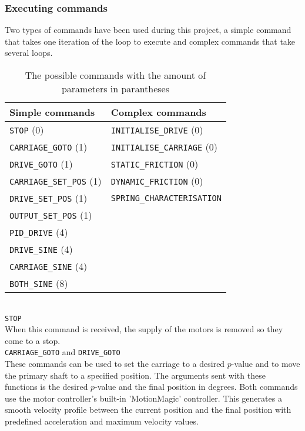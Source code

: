 \documentclass[12pt]{article}
\begin{document}
\subsubsection{Executing commands}
Two types of commands have been used during this project, a simple command that takes one iteration of the loop to execute and complex commands that take several loops. 
\begin{table}[]
    \centering
    \begin{tabular}{|l|l|}
         \hline
         \textbf{Simple commands}&\textbf{Complex commands}  \\
        \hline
         \verb|STOP| (0)&\verb|INITIALISE_DRIVE| (0)\\
         \verb|CARRIAGE_GOTO| (1)&\verb|INITIALISE_CARRIAGE| (0)\\
        \verb|DRIVE_GOTO| (1)&\verb|STATIC_FRICTION| (0)\\
        \verb|CARRIAGE_SET_POS| (1)&\verb|DYNAMIC_FRICTION| (0)\\
        \verb|DRIVE_SET_POS| (1)&\verb|SPRING_CHARACTERISATION|\\
        \verb|OUTPUT_SET_POS| (1)&\\
        \verb|PID_DRIVE| (4)&\\
        \verb|DRIVE_SINE| (4)&\\
        \verb|CARRIAGE_SINE| (4)&\\
        \verb|BOTH_SINE| (8)&\\
        
        \hline    
    
    \end{tabular}
    \caption{The possible commands with the amount of parameters in parantheses}
    \label{tab:my_label}
\end{table}\\

\verb|STOP|\\

When this command is received, the supply of the motors is removed so they come to a stop.\\

\verb|CARRIAGE_GOTO| and \verb|DRIVE_GOTO| \\

These commands can be used to set the carriage to a desired $p$-value and to move the primary shaft to a specified position. The arguments sent with these functions is the desired $p$-value and the final position in degrees. Both commands use the motor controller's built-in 'MotionMagic' controller. This generates a smooth velocity profile between the current position and the final position with predefined acceleration and maximum velocity values. \\
\end{document}
